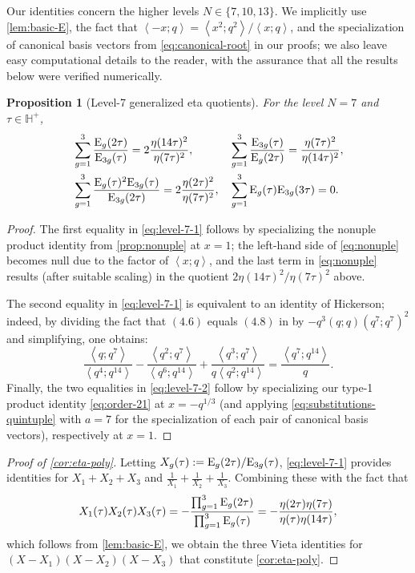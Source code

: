 \documentclass[reqno,11pt]{amsart}
\newtheorem{proposition}[theorem]{Proposition}
\theoremstyle{definition}
\theoremstyle{remark}
\numberwithin{equation}{section}
\renewcommand{\H}{{\mathbb{H}}}
\newcommand{\E}{\textnormal E}
\newcommand{\la}{\left\langle}
\newcommand{\ra}{\right\rangle}
\begin{document}
Our identities concern the higher levels $N \in \{7, 10, 13\}$. We implicitly use \cref{lem:basic-E}, the fact that $\la -x; q \ra = \la x^2; q^2 \ra / \la x; q\ra$, and the specialization of canonical basis vectors from \cref{eq:canonical-root} in our proofs; we also leave easy computational details to the reader, with the assurance that all the results below were verified numerically.

\begin{proposition}[Level-7 generalized eta quotients] \label{prop:level-7}
For the level $N = 7$ and $\tau \in \H^+$,
\begin{align}
    \label{eq:level-7-1}
    &\sum_{g=1}^3 \frac{\E_g(2\tau)}{\E_{3g}(\tau)}
    = 
    2\frac{\eta(14\tau)^2}{\eta(7\tau)^2},
    &
    &\sum_{g=1}^3 \frac{\E_{3g}(\tau)}{\E_g(2\tau)}
    = 
    \frac{\eta(7\tau)^2}{\eta(14\tau)^2},
    \\
    \label{eq:level-7-2}
    &\sum_{g=1}^3 
    \frac{\E_g(\tau)^2 \E_{3g}(\tau)}{\E_{3g}(2\tau)}
    =
    2\frac{\eta(2\tau)^2}{\eta(7\tau)^2},
    &
    &\sum_{g=1}^3 
    \E_g(\tau)\E_{3g}(3\tau)
    =
    0.
\end{align}
\end{proposition}
\begin{proof}
The first equality in \cref{eq:level-7-1} follows by specializing the nonuple product identity from \cref{prop:nonuple} at $x = 1$; the left-hand side of \cref{eq:nonuple} becomes null due to the factor of $\la x; q\ra$, and the last term in \cref{eq:nonuple} results (after suitable scaling) in the quotient $2\eta(14\tau)^2/\eta(7\tau)^2$ above.

The second equality in \cref{eq:level-7-1} is equivalent to an identity of Hickerson; indeed, by dividing the fact that $(4.6)$ equals $(4.8)$ in \cite{hickerson1988seventh} by $-q^3(q; q)\left(q^7; q^7\right)^2$ and simplifying, one obtains:
\[
\frac{\la q; q^7 \ra}{\la q^4; q^{14} \ra} - \frac{\la q^2; q^7 \ra}{\la q^6; q^{14} \ra} + \frac{\la q^3; q^7 \ra}{q\la q^2; q^{14} \ra} = \frac{\la q^7; q^{14} \ra}{q}.
\]
Finally, the two equalities in \cref{eq:level-7-2} follow by specializing our type-1 product identity \cref{eq:order-21} at $x = -q^{1/3}$ (and applying \cref{eq:substitutions-quintuple} with $a = 7$ for the specialization of each pair of canonical basis vectors), respectively at $x = 1$.
\end{proof}


\begin{proof}[Proof of \cref{cor:eta-poly}]
Letting $X_g(\tau) := \E_g(2\tau)/\E_{3g}(\tau)$, \cref{eq:level-7-1} provides identities for $X_1 + X_2 + X_3$ and $\frac{1}{X_1} + \frac{1}{X_2} + \frac{1}{X_3}$. Combining these with the fact that
\[
    X_1(\tau)X_2(\tau)X_3(\tau) 
    =
    -\frac{\prod_{g=1}^3 \E_g(2\tau)}{\prod_{g=1}^3 \E_g(\tau)}
    =
    -\frac{\eta(2\tau)\eta(7\tau)}{\eta(\tau)\eta(14\tau)},
\]
which follows from \cref{lem:basic-E}, we obtain the three Vieta identities for $(X - X_1)(X - X_2)(X - X_3)$ that constitute \cref{cor:eta-poly}.
\end{proof}
\end{document}
